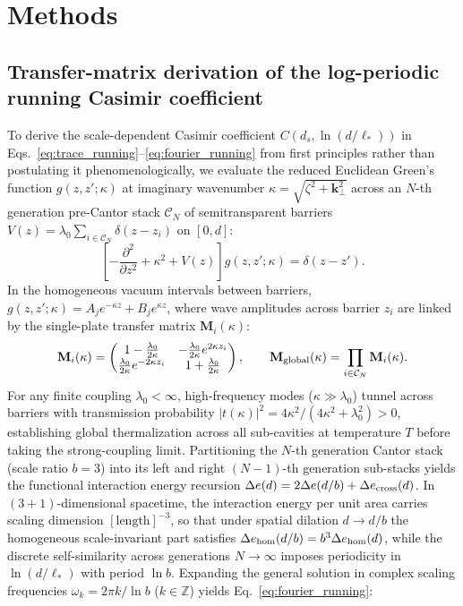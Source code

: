 \documentclass[11pt,letterpaper]{article}
\begin{document}
\newpage
\section*{Methods}
\label{sec:methods}

\subsection*{Transfer-matrix derivation of the log-periodic running Casimir coefficient}
To derive the scale-dependent Casimir coefficient $C(d_s, \ln(d/\ell_*))$ in Eqs.~\eqref{eq:trace_running}--\eqref{eq:fourier_running} from first principles rather than postulating it phenomenologically\cite{gordon2026prd}, we evaluate the reduced Euclidean Green's function $g(z, z'; \kappa)$ at imaginary wavenumber $\kappa = \sqrt{\zeta^2 + \mathbf{k}_\perp^2}$ across an $N$-th generation pre-Cantor stack $\mathcal{C}_N$ of semitransparent barriers $V(z) = \lambda_0 \sum_{i \in \mathcal{C}_N} \delta(z - z_i)$ on $[0, d]$:
\begin{equation}
\left[ -\frac{\partial^2}{\partial z^2} + \kappa^2 + V(z) \right] g(z, z'; \kappa) = \delta(z - z').
\end{equation}
In the homogeneous vacuum intervals between barriers, $g(z, z'; \kappa) = A_j e^{-\kappa z} + B_j e^{\kappa z}$, where wave amplitudes across barrier $z_i$ are linked by the single-plate transfer matrix $\mathbf{M}_i(\kappa)$:
\begin{equation}
\mathbf{M}_i(\kappa) = \begin{pmatrix} 1 - \frac{\lambda_0}{2\kappa} & -\frac{\lambda_0}{2\kappa} e^{2\kappa z_i} \\ \frac{\lambda_0}{2\kappa} e^{-2\kappa z_i} & 1 + \frac{\lambda_0}{2\kappa} \end{pmatrix}, \qquad \mathbf{M}_{\rm global}(\kappa) = \prod_{i \in \mathcal{C}_N} \mathbf{M}_i(\kappa).
\end{equation}
For any finite coupling $\lambda_0 < \infty$, high-frequency modes ($\kappa \gg \lambda_0$) tunnel across barriers with transmission probability $|t(\kappa)|^2 = 4\kappa^2 / (4\kappa^2 + \lambda_0^2) > 0$, establishing global thermalization across all sub-cavities at temperature $T$ before taking the strong-coupling limit\cite{gordon2026prd}. Partitioning the $N$-th generation Cantor stack (scale ratio $b=3$) into its left and right $(N-1)$-th generation sub-stacks yields the functional interaction energy recursion $\Delta e(d) = 2\Delta e(d/b) + \Delta e_{\rm cross}(d)$. In $(3+1)$-dimensional spacetime, the interaction energy per unit area carries scaling dimension $[\text{length}]^{-3}$, so that under spatial dilation $d \to d/b$ the homogeneous scale-invariant part satisfies $\Delta e_{\rm hom}(d/b) = b^3 \Delta e_{\rm hom}(d)$, while the discrete self-similarity across generations $N \to \infty$ imposes periodicity in $\ln(d/\ell_*)$ with period $\ln b$. Expanding the general solution in complex scaling frequencies $\omega_k = 2\pi k / \ln b$ ($k \in \mathbb{Z}$) yields Eq.~\eqref{eq:fourier_running}:
\end{document}
